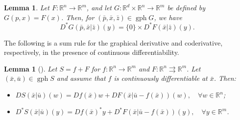 \documentclass[reqno]{amsart}
\newtheorem{lemma}[proposition]{Lemma}
\numberwithin{equation}{section}
\newcommand{\R}{\mathbb{R}}
\newcommand{\x}{\bar{x}}
\newcommand{\gph}{\operatorname{gph}}
\begin{document}
\begin{lemma}\label{lem:CodAux} Let $F:\R^n\to \R^m$, and let  $G:\R^d\times \R^n\to \R^m$ be defined by $G(p,x)=F(x)$. Then, for $(\bar p,\bar x, \bar z)\in \gph G$, we have
\[
D^*G(\bar p, \bar x|\bar z)(y)= \{0\}\times D^*F(\bar x|\bar z)(y).
\]
\end{lemma}

\noindent
The following is a sum rule for the graphical derivative and coderivative, respectively, in the presence of continuous differentiability. 

\begin{lemma}[{\cite[Exercise 10.43]{RoW 98}}]\label{lem:Sum} Let $S=f+F$ for $f: \R^{n} \to \R^{m}$ and   $F: \R^{n} \rightrightarrows \R^{m}$. Let $(\bar x,\bar u)\in \gph S$ and assume that $f$ is continuously differentiable at $\bar x$. Then:
\begin{itemize}
    \item [(a)] $DS(\bar x|\bar u)(w)=Df(\bar x)w+DF(\bar x|\bar u-f(\bar x))(w),\quad \forall w\in \R^{n}$;
    \item[(b)]  $D^*S(\bar x|\bar u)(y)=Df(\bar x)^*y+D^*F(\bar x|\bar u-f(\bar x))(y),\quad \forall y\in \R^{m}$. 
\end{itemize}
\end{lemma}

\end{document}
